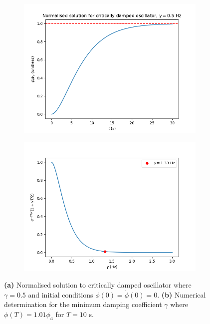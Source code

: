 \documentclass{article}
\begin{document}
\begin{figure}
    \centering
    \begin{subfigure}{.48\textwidth}
        \includegraphics[width=\textwidth]{figs/crit_damped_gamma=0.5.png}
        \subcaption{}
        \label{fig:crit_damped}
    \end{subfigure}
    \hfill
    \begin{subfigure}{.48
        \textwidth}
        \includegraphics[width=\textwidth]{figs/numerical_det.png}
        \subcaption{}
        \label{fig:numeric}
    \end{subfigure}
    \caption{\textbf{(a)} Normalised solution to critically damped oscillator where $\gamma = 0.5$ and initial conditions $\phi(0) = \dot\phi(0) = 0$. 
    \textbf{(b)} Numerical determination for the minimum damping coefficient $\gamma$ where $\phi(T) = 1.01\phi_a$ for $T = 10$ s.}
    
\end{figure}
\end{document}
